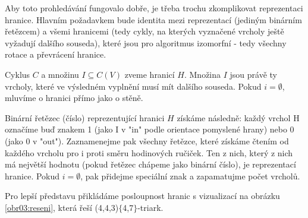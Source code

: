 Aby toto prohledávání fungovalo dobře, je třeba trochu zkomplikovat reprezentaci hranice. Hlavním požadavkem bude identita mezi reprezentací (jediným binárním řetězcem) a všemi hranicemi (tedy cykly, na kterých vyznačené vrcholy ještě vyžadují dalšího souseda), které jsou pro algoritmus izomorfní - tedy všechny rotace a převrácení hranice.

\begin{definice}\label{def01:1}
Cyklus $C$ a množinu $I \subseteq C(V)$ zveme hranicí $H$. Množina $I$ jsou právě ty vrcholy, které ve výsledném vyplnění musí mít dalšího souseda. Pokud  $i = \emptyset$, mluvíme o hranici přímo jako o stěně.

Binární řetězec (číslo) reprezentující hranici $H$ získáme následně: každý vrchol H označíme buď znakem 1 (jako I v "in" podle orientace pomyslené hrany) nebo 0 (jako 0 v "out"). Zaznamenejme pak všechny řetězce, které získáme čtením od každého vrcholu pro i proti směru hodinových ručiček. Ten z nich, který z nich má největší hodnotu (pokud řetězec chápeme jako binární číslo), je reprezentací hranice. Pokud $i = \emptyset$, pak přidejme speciální znak a zapamatujme počet vrcholů.
\end{definice}

Pro lepší představu přikládáme posloupnost hranic s vizualizací na obrázku \ref{obr03:reseni}, která řeší (4,4,3)$\lbrace$4,7$\rbrace$-triark. 

